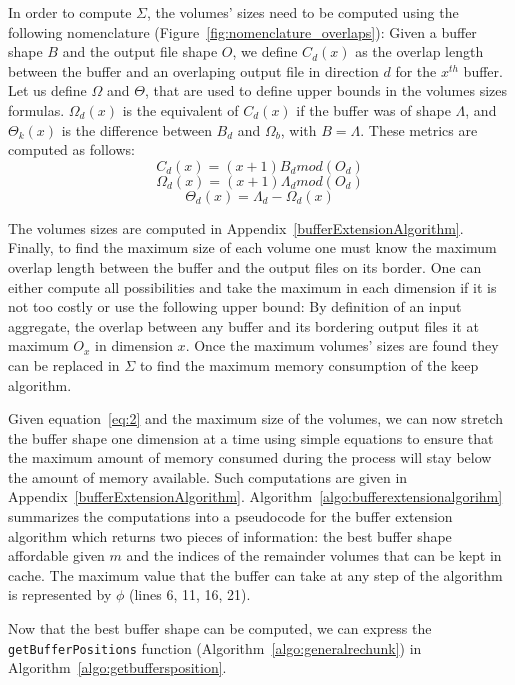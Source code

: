 \documentclass[conference]{IEEEtran}
\begin{document}
In order to compute $\Sigma$, the volumes' sizes need to be computed using the
following nomenclature (Figure~\ref{fig:nomenclature_overlaps}):
Given a buffer shape $B$ and the output file shape $O$, we define $C_d(x)$ as
the overlap length between the buffer and an overlaping output file in direction
$d$ for the $x^{th}$ buffer. Let us define $\Omega$ and $\Theta$, that are used
to define upper bounds in the volumes sizes formulas. $\Omega_d(x)$ is the
equivalent of $C_d(x)$ if the buffer was of shape $\Lambda$, and $\Theta_k(x)$
is the difference between $B_d$ and $\Omega_b$, with $B=\Lambda$.
These metrics are computed as follows:
$$C_d(x) = (x+1)B_d mod(O_d)$$
$$\Omega_d(x) = (x+1)\Lambda_d mod(O_d)$$
$$\Theta_d(x) = \Lambda_d - \Omega_d(x)$$

The volumes sizes are computed in Appendix~\ref{bufferExtensionAlgorithm}.
Finally, to find the maximum size
of each volume one must know the maximum overlap length between the buffer and
the output files on its border. One can either compute all possibilities and
take the maximum in each dimension if it is not too costly or use the following
upper bound: By definition of an input aggregate, the overlap between any buffer
and its bordering output files it at maximum $O_x$ in dimension $x$. Once the
maximum volumes' sizes are found they can be replaced in $\Sigma$ to find the
maximum memory consumption of the keep algorithm.

Given equation~\ref{eq:2} and the maximum size of the volumes, we can now
stretch the buffer shape one dimension at a time using simple equations to ensure
that the maximum amount of memory consumed during the process will stay below the
amount of memory available. Such computations are given in
Appendix~\ref{bufferExtensionAlgorithm}.
Algorithm~\ref{algo:bufferextensionalgorihm} summarizes the computations into a
pseudocode for the buffer extension algorithm which returns two pieces of
information: the best buffer shape affordable given $m$ and the indices of the
remainder volumes that can be kept in cache. The maximum value that the buffer
can take at any step of the algorithm is represented by $\phi$ (lines 6, 11,
16, 21).

Now that the best buffer shape can be computed, we can express the
\texttt{getBufferPositions} function (Algorithm~\ref{algo:generalrechunk}) in
Algorithm~\ref{algo:getbuffersposition}.
\end{document}
